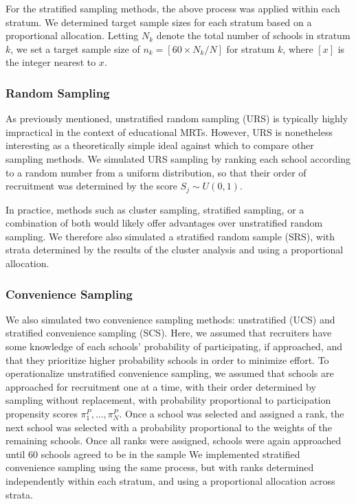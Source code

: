 \documentclass[man,floatsintext]{apa6}
\begin{document}
For the stratified sampling methods, the above process was applied within each stratum. We determined target sample sizes for each stratum based on a proportional allocation. Letting \(N_k\) denote the total number of schools in stratum \(k\), we set a target sample size of \(n_k = [60 \times N_k / N]\) for stratum \(k\), where \([x]\) is the integer nearest to \(x\).

\hypertarget{random-sampling}{%
\subsubsection{Random Sampling}\label{random-sampling}}

As previously mentioned, unstratified random sampling (URS) is typically highly impractical in the context of educational MRTs. However, URS is nonetheless interesting as a theoretically simple ideal against which to compare other sampling methods. We simulated URS sampling by ranking each school according to a random number from a uniform distribution, so that their order of recruitment was determined by the score \(S_j \sim U(0, 1)\).

In practice, methods such as cluster sampling, stratified sampling, or a combination of both would likely offer advantages over unstratified random sampling. We therefore also simulated a stratified random sample (SRS), with strata determined by the results of the cluster analysis and using a proportional allocation.

\hypertarget{convenience-sampling}{%
\subsubsection{Convenience Sampling}\label{convenience-sampling}}

We also simulated two convenience sampling methods: unstratified (UCS) and stratified convenience sampling (SCS). Here, we assumed that recruiters have some knowledge of each schools' probability of participating, if approached, and that they prioritize higher probability schools in order to minimize effort.
To operationalize unstratified convenience sampling, we assumed that schools are approached for recruitment one at a time, with their order determined by sampling without replacement, with probability proportional to participation propensity scores \(\pi^P_1,...,\pi^P_N\).
Once a school was selected and assigned a rank, the next school was selected with a probability proportional to the weights of the remaining schools. Once all ranks were assigned, schools were again approached until 60 schools agreed to be in the sample
We implemented stratified convenience sampling using the same process, but with ranks determined independently within each stratum, and using a proportional allocation across strata.
\end{document}
